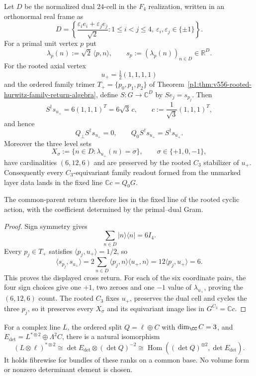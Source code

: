 \documentclass[11pt]{article}
\begin{document}
\begin{corollary}
\label{p1:cor:v570-rooted-primal-dual-singlet-return}
Let $D$ be the normalized dual $24$-cell in the $F_4$ realization, written in
an orthonormal real frame as
\[
 D=\left\{\frac{\varepsilon_i e_i+\varepsilon_j e_j}{\sqrt2}:
 1\le i<j\le4,\ \varepsilon_i,\varepsilon_j\in\{\pm1\}\right\}.
\]
For a primal unit vertex $p$ put
\[
 \lambda_p(n):=\sqrt2\,\langle p,n\rangle,
 \qquad s_p:=(\lambda_p(n))_{n\in D}\in\mathbb R^D.
\]
For the rooted axial vertex
\[
 u_+=\tfrac12(1,1,1,1)
\]
and the ordered family trimer $T_+=\{p_0,p_1,p_2\}$ of
Theorem~\ref{p1:thm:v556-rooted-hurwitz-family-return-algebra}, define
$S:G\to\mathbb C^D$ by $Se_j=s_{p_j}$.  Then
\[
 \boxed{S^\dagger s_{u_+}=6(1,1,1)^T=6\sqrt3\,c,}
 \qquad c:=\frac1{\sqrt3}(1,1,1)^T,
\]
and hence
\[
 \boxed{Q_\perp S^\dagger s_{u_+}=0,\qquad
 Q_0S^\dagger s_{u_+}=S^\dagger s_{u_+}.}
\]
Moreover the three level sets
\[
 X_\sigma:=\{n\in D:\lambda_{u_+}(n)=\sigma\},
 \qquad \sigma\in\{+1,0,-1\},
\]
have cardinalities $(6,12,6)$ and are preserved by the rooted $C_3$ stabilizer
of $u_+$.  Consequently every $C_3$-equivariant family readout formed from the
unmarked layer data lands in the fixed line $\mathbb Cc=Q_0G$.

The common-parent return therefore lies in the fixed line of the rooted
cyclic action, with the coefficient determined by the primal--dual Gram.
\end{corollary}
\begin{proof}
Sign symmetry gives
\[
 \sum_{n\in D}|n\rangle\langle n|=6I_4.
\]
Every $p_j\in T_+$ satisfies $\langle p_j,u_+\rangle=1/2$, so
\[
 \langle s_{p_j},s_{u_+}\rangle
 =2\sum_{n\in D}\langle p_j,n\rangle\langle u_+,n\rangle
 =12\langle p_j,u_+\rangle=6.
\]
This proves the displayed cross return.  For each of the six coordinate pairs,
the four sign choices give one $+1$, two zeroes and one $-1$ value of
$\lambda_{u_+}$, proving the $(6,12,6)$ count.  The rooted $C_3$ fixes $u_+$,
preserves the dual cell and cycles the three $p_j$, so it preserves every
$X_\sigma$ and its equivariant image lies in $G^{C_3}=\mathbb Cc$.
\end{proof}




\begin{proposition}
\label{p1:prop:axial-relative-determinant-line}
For a complex line \(L\), the ordered split \(Q=\ell\oplus C\) with
\(\dim_\CC C=3\), and \(E_{\det}=L^{*\otimes2}\oplus\Lambda^2C\),
there is a natural isomorphism
\begin{equation}
\label{p1:eq:axial-relative-determinant-line}
 (L\otimes\ell)^{*\otimes2}
 \cong\det E_{\det}\otimes(\det Q)^{-2}
 \cong\operatorname{Hom}((\det Q)^{\otimes2},\det E_{\det}).
\end{equation}
It holds fibrewise for bundles of these ranks on a common base.  No volume
form or nonzero determinant element is chosen.
\end{proposition}
\end{document}
